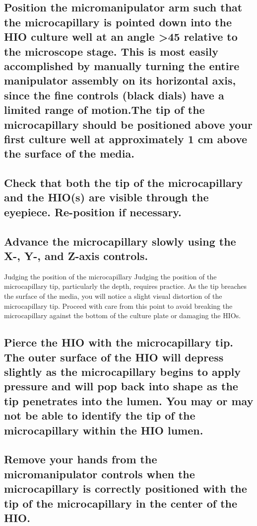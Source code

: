 \documentclass[11pt]{article}
\begin{document}
\subsection{{\sffamily } Position the micromanipulator arm such that the microcapillary is pointed down into the HIO culture well at an angle >45\textdegree{} relative to the microscope stage. This is most easily accomplished by manually turning the entire manipulator assembly on its horizontal axis, since the fine controls (black dials) have a limited range of motion.The tip of the microcapillary should be positioned above your first culture well at approximately 1 cm above the surface of the media.}
\label{sec:orgheadline47}
\subsection{{\sffamily } Check that both the tip of the microcapillary and the HIO(s) are visible through the eyepiece. Re-position if necessary.}
\label{sec:orgheadline48}
\subsection{{\sffamily } Advance the microcapillary slowly using the X-, Y-, and Z-axis controls.}
\label{sec:orgheadline49}
\begin{bclogo}[logo=\bcinfo, couleurBarre=Black, noborder=true, couleur=gray!10]{     Judging the position of the microcapillary}
Judging the position of the microcapillary tip, particularly the depth, requires practice. As the tip breaches the surface of the media, you will notice a slight visual distortion of the microcapillary tip. Proceed with care from this point to avoid breaking the microcapillary against the bottom of the culture plate or damaging the HIOs.\\
\end{bclogo}
\subsection{{\sffamily } Pierce the HIO with the microcapillary tip. The outer surface of the HIO will depress slightly as the microcapillary begins to apply pressure and will pop back into shape as the tip penetrates into the lumen. You may or may not be able to identify the tip of the microcapillary within the HIO lumen.}
\label{sec:orgheadline50}
\subsection{{\sffamily } Remove your hands from the micromanipulator controls when the microcapillary is correctly positioned with the tip of the microcapillary in the center of the HIO.}
\label{sec:orgheadline51}
\end{document}
